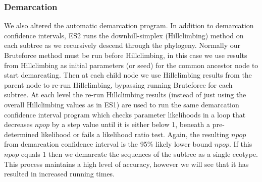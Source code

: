 \subsubsection*{Demarcation}
We also altered the automatic demarcation program.
In addition to demarcation confidence intervals, ES2 runs the downhill-simplex (Hillclimbing) method on each subtree as we recursively descend through the phylogeny.
Normally our Bruteforce method must be run before Hillclimbing, in this case we use results from Hillclimbing as initial parameters (or seed) for the common ancestor node to start demarcating.
Then at each child node we use Hillclimbing results from the parent node to re-run Hillclimbing, bypassing running Bruteforce for each subtree.
At each level the re-run Hillclimbing results (instead of just using the overall Hillclimbing values as in ES1) are used to run the same demarcation confidence interval program which checks parameter likelihoods in a loop that decreases $npop$ by a step value until it is either below 1, beneath a pre-determined likelihood or fails a likelihood ratio test.
Again, the resulting $npop$ from demarcation confidence interval is the 95\% likely lower bound $npop$.
If this $npop$ equals 1 then we demarcate the sequences of the subtree as a single ecotype.
This process maintains a high level of accuracy, however we will see that it has resulted in increased running times.

